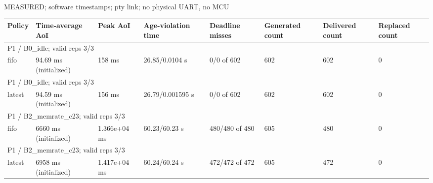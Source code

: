 \par\noindent MEASURED; software timestamps; pty link; no physical UART, no MCU\par
\begin{tabular}{llllllll}
\toprule
Policy & Time-average AoI & Peak AoI & Age-violation time & Deadline misses & Generated count & Delivered count & Replaced count \\
\midrule
\multicolumn{8}{l}{P1 / B0\_idle; valid reps 3/3} \\
fifo & 94.69 ms (initialized) & 158 ms & 26.85/0.0104 s & 0/0 of 602 & 602 & 602 & 0 \\
\multicolumn{8}{l}{P1 / B0\_idle; valid reps 3/3} \\
latest & 94.59 ms (initialized) & 156 ms & 26.79/0.001595 s & 0/0 of 602 & 602 & 602 & 0 \\
\multicolumn{8}{l}{P1 / B2\_memrate\_c23; valid reps 3/3} \\
fifo & 6660 ms (initialized) & 1.366e+04 ms & 60.23/60.23 s & 480/480 of 480 & 605 & 480 & 0 \\
\multicolumn{8}{l}{P1 / B2\_memrate\_c23; valid reps 3/3} \\
latest & 6958 ms (initialized) & 1.417e+04 ms & 60.24/60.24 s & 472/472 of 472 & 605 & 472 & 0 \\
\bottomrule
\end{tabular}
